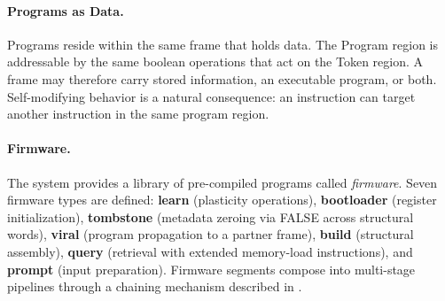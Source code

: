 \paragraph{Programs as Data.}
Programs reside within the same frame that holds data.  The Program
region is addressable by the same boolean operations that act on the
Token region.  A frame may therefore carry stored information, an
executable program, or both.  Self-modifying behavior is a natural
consequence: an instruction can target another instruction in the same
program region.

\paragraph{Firmware.}
The system provides a library of pre-compiled programs called
\emph{firmware}.  Seven firmware types are defined:
\textbf{learn} (plasticity operations),
\textbf{bootloader} (register initialization),
\textbf{tombstone} (metadata zeroing via FALSE across structural words),
\textbf{viral} (program propagation to a partner frame),
\textbf{build} (structural assembly),
\textbf{query} (retrieval with extended memory-load instructions), and
\textbf{prompt} (input preparation).
Firmware segments compose into multi-stage pipelines through a chaining
mechanism described in .
